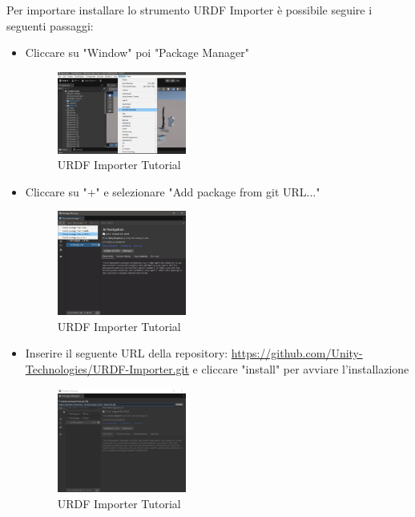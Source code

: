 \documentclass[11pt]{report}
\begin{document}
Per importare installare lo strumento URDF Importer è possibile seguire i seguenti passaggi:
\begin{itemize}
    \item Cliccare su "Window" poi "Package Manager"
    \begin{figure}[H]
        \centering
        \includegraphics[width=0.4\textwidth]{images/URDF_Importer_1.png}
        \caption{URDF Importer Tutorial}
        \label{fig:URDF_Importer_1}
    \end{figure}
    \item Cliccare su "+" e selezionare "Add package from git URL..."
    \begin{figure}[H]
        \centering
        \includegraphics[width=0.4\textwidth]{images/URDF_Importer_2.png}
        \caption{URDF Importer Tutorial}
        \label{fig:URDF_Importer_2}
    \end{figure}
    \item Inserire il seguente URL della repository: 
    \url{https://github.com/Unity-Technologies/URDF-Importer.git} e cliccare "install" per avviare l'installazione
    \begin{figure}[H]
        \centering
        \includegraphics[width=0.4\textwidth]{images/URDF_Importer_3.png}
        \caption{URDF Importer Tutorial}
        \label{fig:URDF_Importer_3}
    \end{figure}
\end{itemize}
\end{document}
